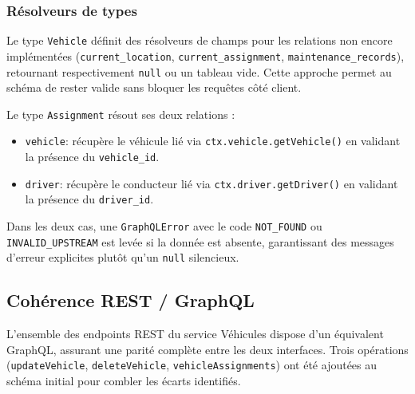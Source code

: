 \documentclass[12pt,a4paper]{article}
\begin{document}
\subsubsection*{Résolveurs de types}

Le type \texttt{Vehicle} définit des résolveurs de champs pour les relations non
encore implémentées (\texttt{current\_location}, \texttt{current\_assignment},
\texttt{maintenance\_records}), retournant respectivement \texttt{null} ou un
tableau vide. Cette approche permet au schéma de rester valide sans bloquer les
requêtes côté client.

Le type \texttt{Assignment} résout ses deux relations :

\begin{itemize}
  \item \texttt{vehicle}: récupère le véhicule lié via \texttt{ctx.vehicle.getVehicle()}
        en validant la présence du \texttt{vehicle\_id}.
  \item \texttt{driver}: récupère le conducteur lié via \texttt{ctx.driver.getDriver()}
        en validant la présence du \texttt{driver\_id}.
\end{itemize}

Dans les deux cas, une \texttt{GraphQLError} avec le code \texttt{NOT\_FOUND} ou
\texttt{INVALID\_UPSTREAM} est levée si la donnée est absente, garantissant des
messages d'erreur explicites plutôt qu'un \texttt{null} silencieux.

\newpage

\subsection{Cohérence REST / GraphQL}

L'ensemble des endpoints REST du service Véhicules dispose d'un équivalent GraphQL,
assurant une parité complète entre les deux interfaces. Trois opérations
(\texttt{updateVehicle}, \texttt{deleteVehicle}, \texttt{vehicleAssignments}) ont
été ajoutées au schéma initial pour combler les écarts identifiés.
\end{document}
